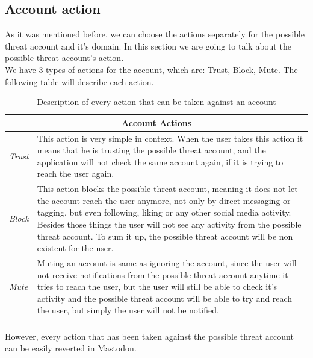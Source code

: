 \subsection{Account action}\label{ss:act_action}
As it was mentioned before, we can choose the actions separately for the possible threat account and it's
domain. In this section we are going to talk about the possible threat account's action.
\\[5pt]
We have 3 types of actions for the account, which are: Trust, Block, Mute.
The following table will describe each action.
\begin{center}
	\begin{longtable}{ | p{} | p{} | }
		
		\hline
		\multicolumn{2}{|c|}{\textbf{Account Actions}}
		\\ \hline
		

		\hline
		\endfirsthead %
		
		\hline
		\hline
		\endhead %
		
		\hline
		\endfoot %
		
		\endlastfoot %
		
		\emph{Trust}
		& This action is very simple in context. When the user takes this action it means
		that he is trusting the possible threat account, and the application will not check the same account again, if it is trying to reach the user again.
		\\ \hline
		
		\emph{Block}
		& This action blocks the possible threat account, meaning it does not let the account reach the user anymore, not only by direct messaging or tagging, but even following, liking or any other social media activity. Besides those things the user will not see any activity from the possible threat account. To sum it up, the possible threat account will be non existent for the user.
		\\ \hline
		
		\emph{Mute}
		& Muting an account is same as ignoring the account, since the user will not receive notifications from the possible threat account anytime it tries to reach the user, but the user will still be able to check it's activity and the possible threat account will be able to try and reach the user, but simply the user will not be notified.
		\\ \hline
		
		\caption{Description of every action that can be taken against an account}
		\label{tab:account_ac_d}		
	\end{longtable}
\end{center}
However, every action that has been taken against the possible threat account can be easily reverted in Mastodon.
